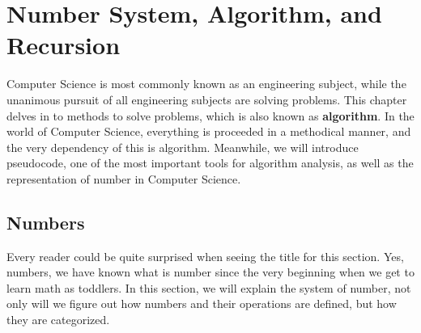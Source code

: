 \chapterspaceabove{5.75cm} %
\chapterspacebelow{10cm} %
\chapter{Number System, Algorithm, and Recursion}

Computer Science is most commonly known as an engineering subject, while the unanimous pursuit of all engineering subjects are solving problems. This chapter delves in to methods to solve problems, which is also known as \textbf{algorithm}. In the world of Computer Science, everything is proceeded in a methodical manner, and the very dependency of this is algorithm. Meanwhile, we will introduce pseudocode, one of the most important tools for algorithm analysis, as well as the representation of number in Computer Science.


\section{Numbers}
Every reader could be quite surprised when seeing the title for this section. Yes, numbers, we have known what is number since the very beginning when we get to learn math as toddlers. In this section, we will explain the system of number, not only will we figure out how numbers and their operations are defined, but how they are categorized.
